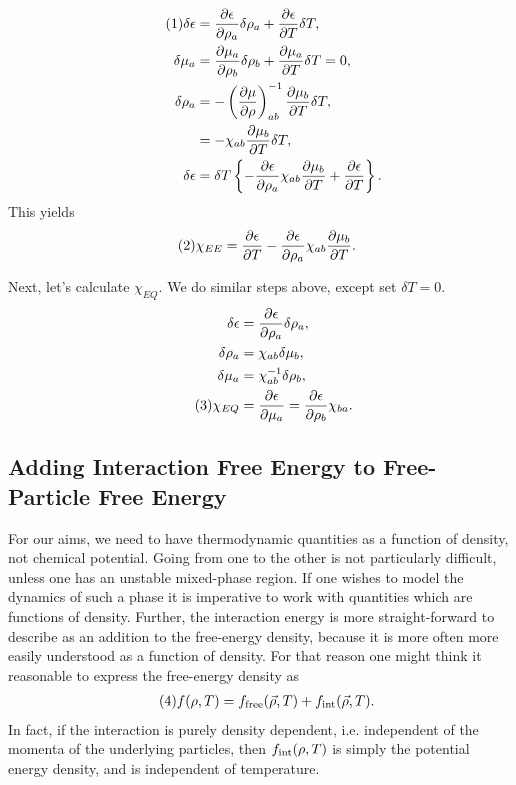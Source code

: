 \documentclass[12pt]{article}
\numberwithin{equation}{section}
\numberwithin{figure}{section}
\newcommand\eqnumber{\addtocounter{equation}{1}\tag{\theequation}}
\begin{document}
\begin{align*}\eqnumber
\delta\epsilon&=
\frac{\partial\epsilon}{\partial\rho_a}\delta\rho_a
+\frac{\partial\epsilon}{\partial T}\delta T,\\
\delta\mu_a&=\frac{\partial\mu_a}{\partial\rho_b}\delta\rho_b+\frac{\partial\mu_a}{\partial T}\delta T=0,\\
\delta\rho_a&=-\left(\frac{\partial\mu}{\partial\rho}\right)_{ab}^{-1}\frac{\partial\mu_b}{\partial T}\delta T,\\
&=-\chi_{ab}\frac{\partial\mu_b}{\partial T}\delta T,\\
\delta\epsilon&=\delta T\left\{
-\frac{\partial \epsilon}{\partial\rho_a}\chi_{ab}\frac{\partial\mu_b}{\partial T}+\frac{\partial\epsilon}{\partial T}
\right\}.
\end{align*}
This yields
\begin{align*}\eqnumber\label{eq:chiEE}
\chi_{EE}&=\frac{\partial\epsilon}{\partial T}
-\frac{\partial\epsilon}{\partial\rho_a}\chi_{ab}\frac{\partial\mu_b}{\partial T}.
\end{align*}

Next, let's calculate $\chi_{EQ}$. We do similar steps above, except set $\delta T=0$.
\begin{align*}
\delta\epsilon&=\frac{\partial\epsilon}{\partial\rho_a}\delta\rho_a,\\
\delta\rho_a&=\chi_{ab}\delta\mu_b,\\
\delta\mu_a&=\chi^{-1}_{ab}\delta\rho_b,\\
\eqnumber\label{eq:chiEQ}
\chi_{EQ}&=\frac{\partial\epsilon}{\partial\mu_a}=\frac{\partial\epsilon}{\partial\rho_b}\chi_{ba}.
\end{align*}

\subsection{Adding Interaction Free Energy to Free-Particle Free Energy}

For our aims, we need to have thermodynamic quantities as a function of density, not chemical potential. Going from one to the other is not particularly difficult, unless one has an unstable mixed-phase region. If one wishes to model the dynamics of such a phase it is imperative to work with quantities which are functions of density. Further, the interaction energy is more straight-forward to describe as an addition to the free-energy density, because it is more often more easily understood as a function of density. For that reason one might think it reasonable to express the free-energy density as
\begin{align*}\eqnumber
f(\rho,T)&=f_{\rm free}(\vec{\rho},T)+f_{\rm int}(\vec{\rho},T).
\end{align*}
In fact, if the interaction is purely density dependent, i.e. independent of the momenta of the underlying particles, then $f_{\rm int}(\rho,T)$ is simply the potential energy density, and is independent of temperature.
\end{document}
